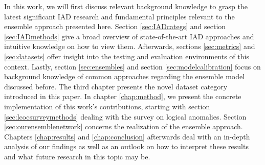 In this work, we will first discuss relevant background knowledge to grasp the latest significant IAD research and fundamental principles relevant to the ensemble 
approach presented here. Section \ref{sec:IADcategs} and section \ref{sec:IADmethods} give a broad overview of state-of-the-art IAD approaches and intuitive knowledge on how to 
view them. Afterwards, sections \ref{sec:metrics} and \ref{sec:datasets} offer insight into the testing and evaluation environments of this context. Lastly, section \ref{sec:ensembles} and 
section \ref{sec:modelcalibration} focus on background knowledge of common approaches regarding the ensemble model discussed before.\newline
The third chapter presents the novel dataset category introduced in this paper.
In chapter \ref{chap:method}, we present the concrete implementation of this work's contributions, starting with section \ref{sec:lcocsurveymethods} dealing with the survey on logical anomalies. 
Section \ref{sec:ourensemblenetwork} concerns the realization of the ensemble approach.
\newline 
Chapters \ref{chap:results} and \ref{chap:conclusion} afterwards deal with an in-depth analysis of our findings as well as an outlook on how to interpret these results and what future research 
in this topic may be.






